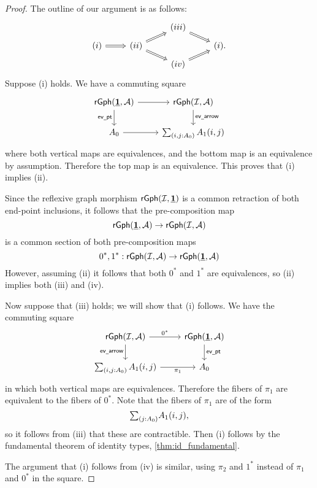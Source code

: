 \begin{proof}
The outline of our argument is as follows:
\begin{equation*}
\begin{tikzcd}[row sep=tiny]
& & (iii) \arrow[dr,Rightarrow] \\
(i) \arrow[r,Rightarrow] & (ii) \arrow[ur,Rightarrow] \arrow[dr,Rightarrow] & & (i). \\
& & (iv) \arrow[ur,Rightarrow]
\end{tikzcd}
\end{equation*}
Suppose (i) holds. We have a commuting square
\begin{equation*}
\begin{tikzcd}
\mathsf{rGph}(\unit,\mathcal{A}) \arrow[d,swap,"\mathsf{ev\usc{}pt}"] \arrow[r] & \mathsf{rGph}(\mathcal{I},\mathcal{A}) \arrow[d,"\mathsf{ev\usc{}arrow}"] \\
\pts{A} \arrow[r] & \sm{i,j:\pts{A}}\edg{A}(i,j)
\end{tikzcd}
\end{equation*}
where both vertical maps are equivalences, and the bottom map is an equivalence by assumption. Therefore the top map is an equivalence. This proves that (i) implies (ii).

Since the reflexive graph morphism $\mathsf{rGph}(\mathcal{I},\underline{\mathbf{1}})$ is a common retraction of both end-point inclusions, it follows that the pre-composition map
\begin{equation*}
\mathsf{rGph}(\underline{\mathbf{1}},\mathcal{A}) \to \mathsf{rGph}(\mathcal{I},\mathcal{A})
\end{equation*}
is a common section of both pre-composition maps
\begin{equation*}
0^\ast,1^\ast:\mathsf{rGph}(\mathcal{I},\mathcal{A})\to \mathsf{rGph}(\underline{\mathbf{1}},\mathcal{A})
\end{equation*}
However, assuming (ii) it follows that both $0^\ast$ and $1^\ast$ are equivalences, so (ii) implies both (iii) and (iv).

Now suppose that (iii) holds; we will show that (i) follows. We have the commuting square
\begin{equation*}
\begin{tikzcd}
\mathsf{rGph}(\mathcal{I},\mathcal{A}) \arrow[d,swap,"\mathsf{ev\usc{}arrow}"] \arrow[r,"0^\ast"] & \mathsf{rGph}(\unit,\mathcal{A}) \arrow[d,"\mathsf{ev\usc{}pt}"] \\
\sm{i,j:\pts{A}}\edg{A}(i,j) \arrow[r,swap,"\pi_1"] & \pts{A}
\end{tikzcd}
\end{equation*}
in which both vertical maps are equivalences. Therefore the fibers of $\pi_1$ are equivalent to the fibers of $0^\ast$. Note that the fibers of $\pi_1$ are of the form
\begin{equation*}
\sm{j:\pts{A}}\edg{A}(i,j),
\end{equation*}
so it follows from (iii) that these are contractible. Then (i) follows by the fundamental theorem of identity types, \cref{thm:id_fundamental}.

The argument that (i) follows from (iv) is similar, using $\pi_2$ and $1^\ast$ instead of $\pi_1$ and $0^\ast$ in the square.
\end{proof}


